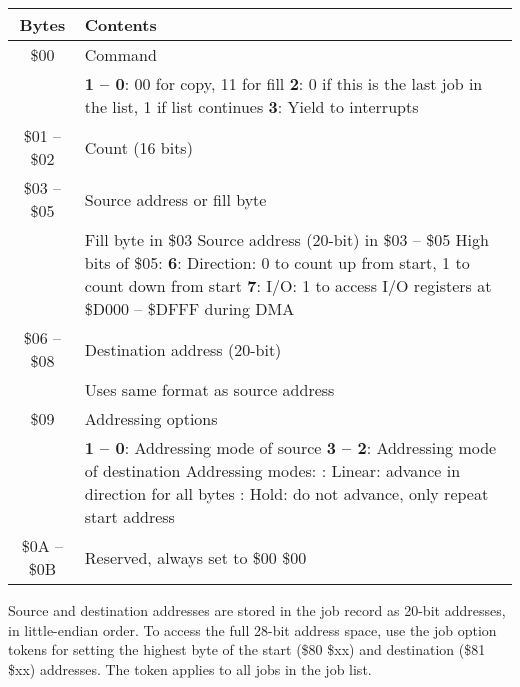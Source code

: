 \begin{center}
\begin{tabular}{|c|p{6cm}|}
\hline
{\bf Bytes} & {\bf Contents} \\
\hline

\$00 & Command \\
& {\bf 1 -- 0}: 00 for copy, 11 for fill \newline
{\bf 2}: 0 if this is the last job in the list, 1 if list continues \newline
{\bf 3}: Yield to interrupts \\
\hline

\$01 -- \$02 & Count (16 bits) \\
\hline

\$03 -- \$05 & Source address or fill byte \\
& Fill byte in \$03 \newline
Source address (20-bit) in \$03 -- \$05 \newline
High bits of \$05: \newline
{\bf 6}: Direction: 0 to count up from start, 1 to count down from start \newline
{\bf 7}: I/O: 1 to access I/O registers at \$D000 -- \$DFFF during DMA \\
\hline

\$06 -- \$08 & Destination address (20-bit) \\
& Uses same format as source address \\
\hline

\$09 & Addressing options \\
& {\bf 1 -- 0}: Addressing mode of source \newline
{\bf 3 -- 2}: Addressing mode of destination \newline
Addressing modes: \newline
00: Linear: advance in direction for all bytes \newline
10: Hold: do not advance, only repeat start address \\
\hline

\$0A -- \$0B & Reserved, always set to \$00 \$00 \\
\hline

\end{tabular}
\end{center}

Source and destination addresses are stored in the job record as 20-bit addresses, in little-endian order. To access the full 28-bit address space, use the job option tokens for setting the highest byte of the start (\$80 \$xx) and destination (\$81 \$xx) addresses. The token applies to all jobs in the job list.

